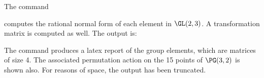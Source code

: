 \bigskip





The command 


computes the rational normal form of each element in $\GL(2,3)$.
A transformation matrix is computed as well. The output is:





\bigskip





\bigskip


The command produces a latex report of the group elements, 
which are matrices of size 4. 
The associated permutation action 
on the 15 points of $\PG(3,2)$ is shown also.
For reasons of space, the output has been truncated.




\bigskip







